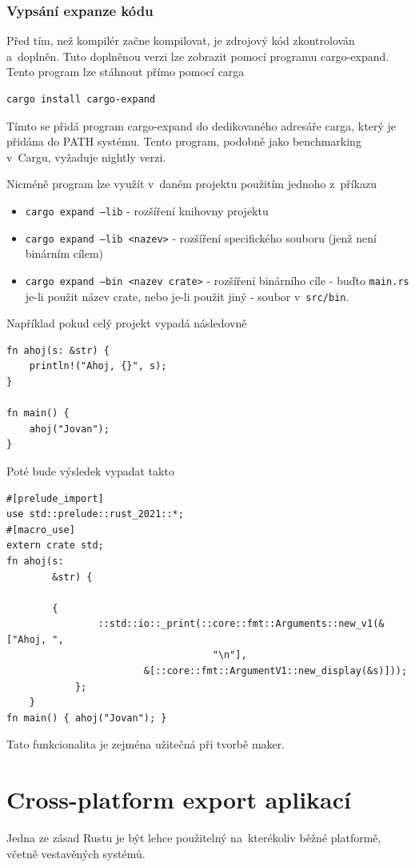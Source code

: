 \documentclass[a4paper, 12pt]{article} %
\newcommand{\bash}[1]{\texttt{#1}}
\begin{document}
		\subsubsection*{Vypsání expanze kódu}
			Před tím, než kompilér začne kompilovat, je zdrojový kód zkontrolován a~doplněn. Tuto doplněnou verzi lze zobrazit pomocí programu cargo-expand. Tento program lze stáhnout přímo pomocí carga
			\begin{verbatim}
cargo install cargo-expand
			\end{verbatim}
			
			Tímto se přidá program cargo-expand do dedikovaného adresáře carga, který je přidána do PATH systému. Tento program, podobně jako benchmarking v~Cargu, vyžaduje nightly verzi.
			
			Nicméně program lze využít v~daném projektu použitím jednoho z~příkazu
			\begin{itemize}
				\item \bash{cargo expand --lib} - rozšíření knihovny projektu
				\item \bash{cargo expand --lib <nazev>} - rozšíření specifického souboru (jenž není binárním cílem)
				\item \bash{cargo expand --bin <nazev crate>} - rozšíření binárního cíle - buďto \texttt{main.rs} je-li použit název crate, nebo je-li použit jiný - soubor v~\texttt{src/bin}.
			\end{itemize}

			Například pokud celý projekt vypadá následovně
			\begin{verbatim}
fn ahoj(s: &str) {
	println!("Ahoj, {}", s);
}

fn main() {
	ahoj("Jovan");
}
			\end{verbatim}
			
			Poté bude výsledek vypadat takto
			\begin{verbatim}
#[prelude_import]
use std::prelude::rust_2021::*;
#[macro_use]
extern crate std;
fn ahoj(s:
		&str) {

		{
				::std::io::_print(::core::fmt::Arguments::new_v1(&["Ahoj, ",
									"\n"],
						&[::core::fmt::ArgumentV1::new_display(&s)]));
			};
	}
fn main() { ahoj("Jovan"); }
			\end{verbatim}
			
			Tato funkcionalita je zejména užitečná při tvorbě maker.


\section{Cross-platform export aplikací}
	Jedna ze zásad Rustu je být lehce použitelný na~kterékoliv běžné platformě, včetně vestavěných systémů.
	
\end{document}
